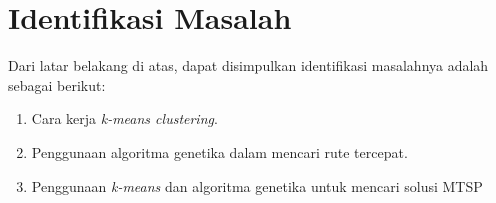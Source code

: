 \section{Identifikasi Masalah}

Dari latar belakang di atas, dapat disimpulkan identifikasi masalahnya adalah sebagai berikut:
\begin{enumerate}
	\item Cara kerja \textit{k-means clustering}.
	\item Penggunaan algoritma genetika dalam mencari rute tercepat.
	\item Penggunaan \textit{k-means} dan algoritma genetika untuk mencari solusi MTSP
\end{enumerate}